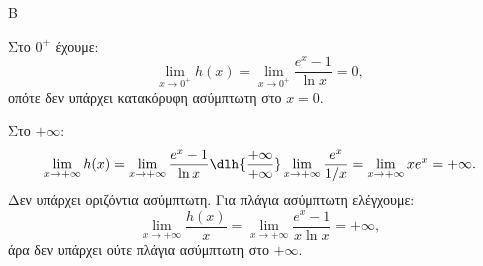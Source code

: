 \begin{thema}{Β}
\begin{erwthma}
Στο $0^+$ έχουμε:
\[ \lim_{x\to0^+} h(x)=\lim_{x\to0^+}\frac{e^x-1}{\ln x}=0, \]
οπότε δεν υπάρχει κατακόρυφη ασύμπτωτη στο $x=0$.

Στο $+\infty$:
\[ \lim_{x\to+\infty} h(x)=\lim_{x\to+\infty}\frac{e^x-1}{\ln x}\dlh{\frac{+\infty}{+\infty}}\lim_{x\to+\infty}\frac{e^x}{1/x}=\lim_{x\to+\infty}xe^x=+\infty. \]
Δεν υπάρχει οριζόντια ασύμπτωτη. Για πλάγια ασύμπτωτη ελέγχουμε:
\[ \lim_{x\to+\infty}\frac{h(x)}{x}=\lim_{x\to+\infty}\frac{e^x-1}{x\ln x}=+\infty, \]
άρα δεν υπάρχει ούτε πλάγια ασύμπτωτη στο $+\infty$.
\end{erwthma}
\end{thema}
